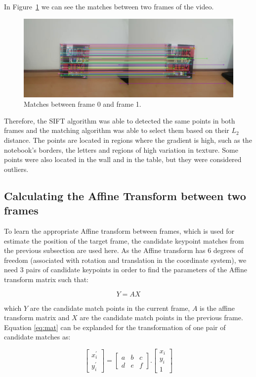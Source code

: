 \documentclass[]{IEEEtran}
\begin{document}
In Figure~\ref{fig:matches_1} we can see the matches between two frames of the video.

\begin{figure}[H]
     \centering
     \includegraphics[width=0.9\hsize]{img/matches_1.jpg}
      \caption{Matches between frame 0 and frame 1.}
     \label{fig:matches_1}
\end{figure}

Therefore, the SIFT algorithm was able to detected the same points in both frames and the matching algorithm was able to select them based on their $L_2$ distance. The points are located in regions where the gradient is high, such as the notebook's borders, the letters and regions of high variation in texture. Some points were also located in the wall and in the table, but they were considered outliers.


\subsection{Calculating the Affine Transform between two frames}

To learn the appropriate Affine transform between frames, which is used for estimate the position of the target frame, the candidate keypoint matches from the previous subsection are used here. As the Affine transform has 6 degrees of freedom (associated with rotation and translation in the coordinate system), we need 3 pairs of candidate keypoints in order to find the parameters of the Affine transform matrix such that:

\begin{equation}
    Y = AX
    \label{eq:mat}
\end{equation}

which $Y$ are the candidate match points in the current frame, $A$ is the affine transform matrix and $X$ are the candidate match points in the previous frame. 
Equation \ref{eq:mat} can be explanded for the transformation of one pair of candidate matches as:

\begin{equation}
\begin{bmatrix}
  x_{i}^{'} \\ y_{i}^{'}
\end{bmatrix}  =
\begin{bmatrix}
  a & b & c \\ d & e & f
\end{bmatrix}.
\begin{bmatrix}
  x_{i} \\ y_{i} \\ 1
\end{bmatrix}  
\end{equation}
\end{document}
